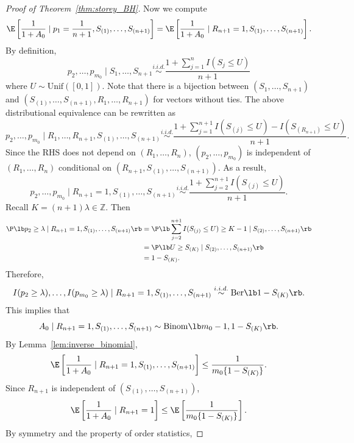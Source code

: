 \begin{proof}[Proof of Theorem~\ref{thm:storey_BH}]
Now we compute
\begin{equation}
  \label{eq:A0}
  \E\left[\frac{1}{1 + A_0}\mid p_1 = \frac{1}{n+1}, S_{(1)}, \ldots, S_{(n+1)}\right] = \E\left[\frac{1}{1 + A_0}\mid R_{n+1} = 1, S_{(1)}, \ldots, S_{(n+1)}\right].
\end{equation}
By definition,
\[p_2, \ldots, p_{m_0} \mid S_1, \ldots, S_{n+1} \stackrel{i.i.d.}{\sim}\frac{1 + \sum_{j=1}^{n}I(S_j\le U)}{n + 1} \]
where $U\sim \mathrm{Unif}([0, 1])$. Note that there is a bijection between $(S_1, \ldots, S_{n+1})$ and $(S_{(1)}, \ldots, S_{(n+1)}, R_{1}, \ldots, R_{n+1})$ for vectors without ties. The above distributional equivalence can be rewritten as
\[p_2, \ldots, p_{m_0} \mid R_1, \ldots, R_{n+1}, S_{(1)}, \ldots, S_{(n+1)}  \stackrel{i.i.d.}{\sim}\frac{1 + \sum_{j=1}^{n+1}I(S_{(j)}\le U) - I(S_{(R_{n+1})} \le U)}{n + 1}.\]
Since the RHS does not depend on $(R_1, \ldots, R_n)$, $(p_2, \ldots, p_{m_0})$ is independent of $(R_1, \ldots, R_n)$ conditional on $(R_{n+1}, S_{(1)}, \ldots, S_{(n+1)})$. As a result,
\[p_2, \ldots, p_{m_0} \mid R_{n+1} = 1, S_{(1)}, \ldots, S_{(n+1)} \stackrel{i.i.d.}{\sim}\frac{1 + \sum_{j=2}^{n+1}I(S_{(j)}\le U)}{n + 1}.\]
Recall $K = (n + 1)\lambda\in \mathbb{Z}$. Then
\begin{align*}
  \P\lb p_2 \ge \lambda \mid R_{n+1} = 1, S_{(1)}, \ldots, S_{(n+1)}\rb
  & = \P\lb \sum_{j=2}^{n+1}I(S_{(j)}\le U)\ge K - 1 \mid S_{(2)}, \ldots, S_{(n+1)}\rb\\
  & = \P\lb U \ge S_{(K)}\mid S_{(2)}, \ldots, S_{(n+1)}\rb\\
  & = 1 - S_{(K)}.
\end{align*}
Therefore,
\[I(p_2 \ge \lambda), \ldots, I(p_{m_0} \ge \lambda) \mid R_{n+1} = 1, S_{(1)}, \ldots, S_{(n+1)} \stackrel{i.i.d.}{\sim}\mathrm{Ber}\lb 1 - S_{(K)}\rb.\]
This implies that
\[A_0\mid R_{n+1} = 1, S_{(1)}, \ldots, S_{(n+1)}\sim \mathrm{Binom}\lb m_0 - 1, 1 - S_{(K)}\rb.\]
By Lemma~\ref{lem:inverse_binomial},
\[\E\left[\frac{1}{1 + A_0}\mid R_{n+1} = 1, S_{(1)}, \ldots, S_{(n+1)}\right]\le \frac{1}{m_0 \{1 - S_{(K)}\}}.\]
Since $R_{n+1}$ is independent of $(S_{(1)}, \ldots, S_{(n+1)})$,
\begin{equation}
  \label{eq:EA0}
  \E\left[\frac{1}{1 + A_0}\mid R_{n+1} = 1\right] \le \E\left[\frac{1}{m_0 \{1 - S_{(K)}\}}\right].
\end{equation}
By symmetry and the property of order statistics,

\end{proof}
